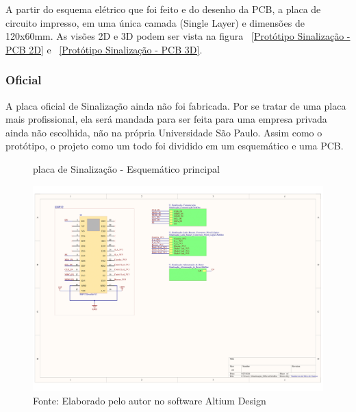 \documentclass[../poliXuniversity_hospital_-USP-report.tex]{subfiles}
\begin{document}
A partir do esquema elétrico que foi feito e do desenho da PCB, a placa de circuito impresso, em uma única camada (Single Layer) e dimensões de 120x60mm. As visões 2D e 3D podem ser vista na figura ~\ref{Protótipo Sinalização - PCB 2D} e ~\ref{Protótipo Sinalização - PCB 3D}.

\clearpage
\subsubsection{Oficial}

A placa oficial de Sinalização ainda não foi fabricada. Por se tratar de uma placa mais profissional, ela será mandada para ser feita para uma empresa privada ainda não escolhida, não na própria Universidade São Paulo. Assim como o protótipo, o projeto como um todo foi dividido em um esquemático e uma PCB.

\begin{figure}[!h]
\centering
    \caption{placa de Sinalização - Esquemático principal }
    \centering %
    \includegraphics[width=17cm]{modulos/Sinalização_Official-1.png}
    \caption*{Fonte: Elaborado pelo autor no software Altium Design\cite{altium21} }
    \label{Protótipo placa de ## - Esquemático principal}
\end{figure}
\end{document}
